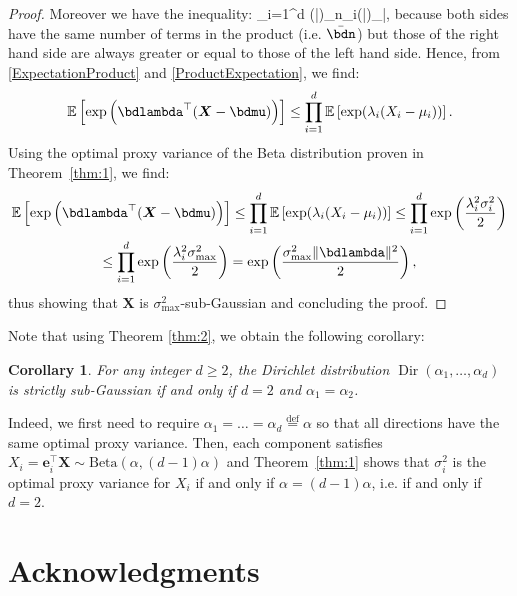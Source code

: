 \documentclass[15pt]{article}
\newcommand{\E}{\mathbb{E}}
\def\E{\mathbb{E}}
\DeclareMathOperator{\Dir}{Dir}
\theoremstyle{plain}
\newtheorem{cor}{{Corollary}}%
\begin{document}
\begin{proof}
Moreover we have the inequality:
\beqq %
\prod_{i=1}^d (\bar{\bdalpha})_{n_i}\leq (\bar{\bdalpha})_{\bar{\bdn}}, \eeqq
because both sides have the same number of terms in the product (i.e. $\bar{\bdn}$) but those of the right hand side are always greater or equal to those of the left hand side. Hence, from \eqref{ExpectationProduct} and \eqref{ProductExpectation}, we find:
\begin{equation*}
\E\left[\exp\left(\bdlambda^\top (\boldsymbol{X}-\bdmu)\right)\right]\leq \prod_{i=1}^d \E\left[\exp(\lambda_i (X_i-\mu_i))\right].
\end{equation*}
Using the optimal proxy variance of the Beta distribution proven in Theorem~\ref{thm:1}, we find:
\begin{multline*}
	\E\left[\exp\left(\bdlambda^\top (\boldsymbol{X}-\bdmu)\right)\right]\leq\prod_{i=1}^d \E\left[\exp(\lambda_i (X_i-\mu_i))\right]\leq\prod_{i=1}^d \exp\left(\frac{\lambda_i^2\sigma_i^2}{2}\right)\\
\leq\prod_{i=1}^d \exp\left(\frac{\lambda_i^2\sigma^2_{\text{max}}}{2}\right)=\exp\left(\frac{\sigma^2_{\text{max}} \|\bdlambda\|^2}{2}\right),
\end{multline*}
thus showing that $\boldsymbol{X}$ is $\sigma^2_{\text{max}}$-sub-Gaussian and concluding the proof.
\end{proof}

Note that using Theorem \ref{thm:2}, we obtain the following corollary:
\begin{cor}\label{cor2}
For any integer $d\geq 2$, the Dirichlet distribution $\Dir(\alpha_1,\dots,\alpha_d)$ is strictly sub-Gaussian if and only if $d=2$ and $\alpha_1=\alpha_2$.
\end{cor}

Indeed, we first need to require $\alpha_1=\dots=\alpha_d\overset{\text{def}}{=}\alpha$ so that all directions have the same optimal proxy variance. Then, each component satisfies $X_i=\boldsymbol{e}_i^\top \boldsymbol{X} \sim \text{Beta}(\alpha, (d-1)\alpha)$ and Theorem~\ref{thm:1} shows that $\sigma_i^2$ is the optimal proxy variance for $X_i$ if and only if $\alpha=(d-1)\alpha$, i.e. if and only if $d=2$.  




\section*{Acknowledgments}
\end{document}
